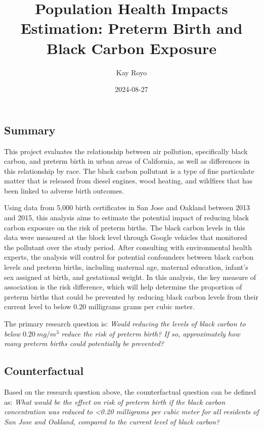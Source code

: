 \documentclass[
]{article}
\title{Population Health Impacts Estimation: Preterm Birth and Black
Carbon Exposure}
\author{Kay Royo}
\date{2024-08-27}
\begin{document}
\maketitle

\subsection{\texorpdfstring{\textbf{Summary}}{Summary}}\label{summary}

This project evaluates the relationship between air pollution,
specifically black carbon, and preterm birth in urban areas of
California, as well as differences in this relationship by race. The
black carbon pollutant is a type of fine particulate matter that is
released from diesel engines, wood heating, and wildfires that has been
linked to adverse birth outcomes.

Using data from 5,000 birth certificates in San Jose and Oakland between
2013 and 2015, this analysis aims to estimate the potential impact of
reducing black carbon exposure on the risk of preterm births. The black
carbon levels in this data were measured at the block level through
Google vehicles that monitored the pollutant over the study period.
After consulting with environmental health experts, the analysis will
control for potential confounders between black carbon levels and
preterm births, including maternal age, maternal education, infant's sex
assigned at birth, and gestational weight. In this analysis, the key
measure of association is the risk difference, which will help determine
the proportion of preterm births that could be prevented by reducing
black carbon levels from their current level to below 0.20 milligrams
grams per cubic meter.

The primary research question is: \emph{Would reducing the levels of
black carbon to below} \(0.20 \ mg/m^3\) \emph{reduce the risk of
preterm birth? If so, approximately how many preterm births could
potentially be prevented?}

\subsection{\texorpdfstring{\textbf{Counterfactual}}{Counterfactual}}\label{counterfactual}

Based on the research question above, the counterfactual question can be
defined as: \emph{What would be the effect on risk of preterm birth if
the black carbon concentration was reduced to \textless0.20 milligrams
per cubic meter for all residents of San Jose and Oakland, compared to
the current level of black carbon?}
\end{document}
